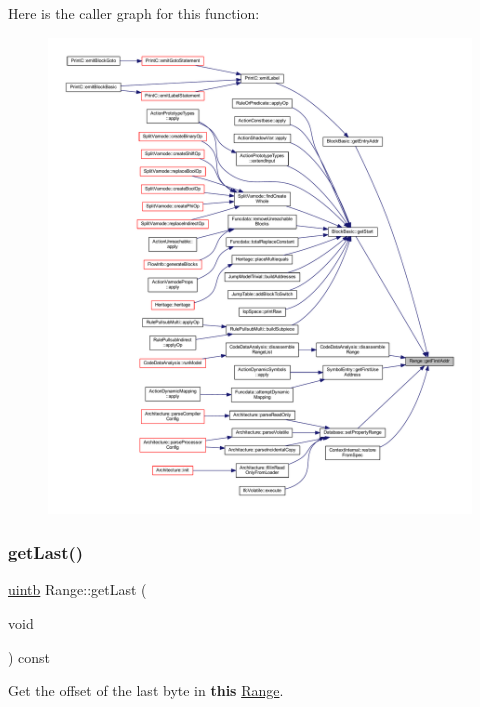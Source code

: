 Here is the caller graph for this function\+:
\nopagebreak
\begin{figure}[H]
\begin{center}
\leavevmode
\includegraphics[width=350pt]{class_range_abdedc039293f93e7687ecb43a21cdf38_icgraph}
\end{center}
\end{figure}
\mbox{\label{class_range_afbcec6b1a5499f299dc8ff7d078cd83c}} 
\subsubsection{\texorpdfstring{getLast()}{getLast()}}
{\footnotesize\ttfamily \mbox{\hyperlink{types_8h_a2db313c5d32a12b01d26ac9b3bca178f}{uintb}} Range\+::get\+Last (\begin{DoxyParamCaption}\item[{void}]{ }\end{DoxyParamCaption}) const\hspace{0.3cm}{\ttfamily [inline]}}



Get the offset of the last byte in {\bfseries{this}} \mbox{\hyperlink{class_range}{Range}}. 



